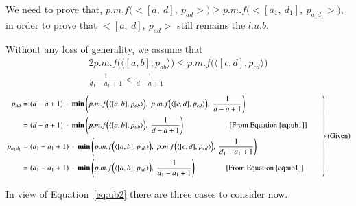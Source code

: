 \documentclass[final,3p, review, times]{Elsevier/elsarticle}
\begin{document}
\noindent We need to prove that, $p.m.f\Big(\big<[a,\ d],\ p_{ad}\big>\Big)\geq p.m.f\Big(\big<[a_1,\ d_1],\ p_{a_1d_1}\big>\Big)$, in order to prove that $\big<[a,\ d],\ p_{ad}\big>$ still remains the $l.u.b$.

\noindent Without any loss of generality, we assume that
\begin{alignat}{2}
p.m.f\Big(\langle[a,b],p_{ab}\rangle\Big)\leq p.m.f\Big(\langle[c,d],p_{cd}\rangle\Big)\label{eq:ub1}\\
\frac{1}{d_1-a_1+1}<\frac{1}{d-a+1}\label{eq:ub2}
\end{alignat}
\begin{equation*}
 \left.\begin{aligned}
        p_{ad}&=(d-a+1)\ \cdot\ \mathbf{min}\left(p.m.f\Big(\langle[a,b],p_{ab}\rangle\Big),\ p.m.f\Big(\langle[c,d],p_{cd}\rangle\Big),\ \frac{1}{d-a+1}\right)\\
        &=(d-a+1)\ \cdot\ \mathbf{min}\left(p.m.f\Big(\langle[a,b],p_{ab}\rangle\Big),\ \frac{1}{d-a+1}\right)\qquad\qquad\qquad[\text{From Equation}~\ref{eq:ub1}]\\
        p_{a_1d_1}&=(d_1-a_1+1)\ \cdot\ \mathbf{min}\left(p.m.f\Big(\langle[a,b],p_{ab}\rangle\Big),\ p.m.f\Big(\langle[c,d],p_{cd}\rangle\Big),\ \frac{1}{d_1-a_1+1}\right)\\
        &=(d_1-a_1+1)\ \cdot\ \mathbf{min}\left(p.m.f\Big(\langle[a,b],p_{ab}\rangle\Big),\ \frac{1}{d_1-a_1+1}\right)\qquad\qquad[\text{From Equation}~\ref{eq:ub1}]
       \end{aligned}\qquad
 \right\}\hfill\text{(Given)}
\end{equation*}

In view of Equation~\ref{eq:ub2} there are three cases to consider now.
\end{document}
